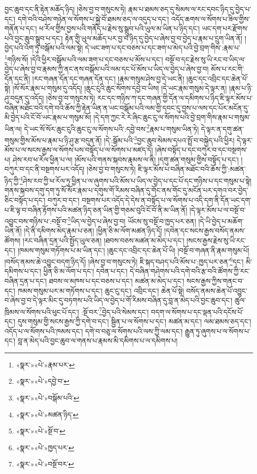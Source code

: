 བྱང་ཆུབ་དང་ནི་རྟེན་མཆོད་ཉིད། །ཅེས་བྱ་བ་གསུངས་ཏེ། རྣམ་པ་ཐམས་ཅད་དུ་སེམས་ལ་རང་དབང་ཉིད་དུ་བྱེད་པ་དང་། དགེ་བའི་བཤེས་གཉེན་ལ་སོགས་པ་སྐྱེ་བོ་ཐམས་ཅད་ལ་འདུད་པ་དང་། འདོད་ཆགས་ལ་སོགས་པ་ཟིལ་གྱིས་གནོན་པ་དང་། ཕ་རོལ་གྱིས་བྱས་པའི་གནོད་པ་རྗེས་སུ་སྒྲུབ་པའི་ཡུལ་མ་ཡིན་པ་ཉིད་དང་། ཡང་དག་པར་རྫོགས་པའི་བྱང་ཆུབ་སྒྲུབ་པ་དང་། རྟེན་གྱི་ཡུལ་མཆོད་པར་བྱ་བ་ཉིད་དུ་བྱེད་པ་ཞེས་བྱ་བ་བྱེད་པ་རྣམ་པ་དྲུག་ཡིན་ནོ། །བྱེད་པའི་འོག་ཏུ་བསྒོམ་པའི་ལམ་སྟེ། དེ་ཡང་ཟག་པ་དང་བཅས་པ་དང་ཟག་པ་མེད་པའི་བྱེ་བྲག་གིས་:རྣམ་པ་\footnote{«སྣར་»«པེ་»རྣམ་པར་}གཉིས་སོ། །དེའི་ཕྱིར་བསྒོམ་པའི་ལམ་ཟག་པ་དང་བཅས་པ་མོས་པ་དང་། བསྔོ་བ་དང་རྗེས་སུ་ཡི་རང་བ་ཡིད་ལ་བྱེད་པ་ཞེས་བྱ་བ་རྣམས་ཀྱི་ནང་ནས་བསྒོམ་པའི་ལམ་དང་པོ་མོས་པ་ཡིད་ལ་བྱེད་པ་ཞེས་བྱ་བ། མོས་པ་རང་གི་དོན་དང་ནི། །རང་གཞན་དོན་དང་གཞན་དོན་དང་། །རྣམ་གསུམ་ཤེས་བྱ་དེ་ཡང་ནི། །ཆུང་དང་འབྲིང་དང་ཆེན་པོ་སྟེ། །སོ་སོར་རྣམ་པ་གསུམ་དུ་འདོད། །ཆུང་ངུའི་ཆུང་སོགས་དབྱེ་བ་ཡིས། །དེ་ཡང་རྣམ་གསུམ་དེ་ལྟར་ན། །རྣམ་པ་ཉི་ཤུ་བདུན་དུ་འདོད། །ཅེས་བྱ་བ་གསུངས་ཏེ། རང་དང་གཉིས་ཀ་དང་གཞན་གྱི་དོན་ལ་དམིགས་པ་ཉིད་ཇི་ལྟར་མོས་པ་བཞིན་མཐོང་བའི་དགེ་བའི་ཆོས་ཀྱི་རྟེན་ཡིན་ན་ཡང་བསྒོམ་པའི་ལམ་གྱི་དབང་དུ་བྱས་པ་ལས་དང་པོར་མངོན་དུ་མི་བྱེད་པའི་ངོ་བོ་ཡང་རྣམ་པ་གསུམ་མོ། །དེ་དག་ཀྱང་རེ་རེ་ཞིང་ཆུང་ངུ་ལ་སོགས་པའི་བྱེ་བྲག་གིས་རྣམ་པ་གསུམ་ཡིན་ལ། དེ་ཡང་སོ་སོར་ཆུང་ངུའི་ཆུང་ངུ་ལ་སོགས་པའི་:དབྱེ་བས་\footnote{«སྣར་»«པེ་»དབྱེ་བ་}རྣམ་པ་གསུམ་ཡིན་ཏེ། དེ་ལྟར་ན་དགུ་ཚན་གསུམ་གྱིས་མོས་པ་རྣམ་པ་ཉི་ཤུ་རྩ་བདུན་ནོ། །དེ་:སྒོམ་པའི་\footnote{«སྣར་»«པེ་»བསྒོམ་པའི་}བྱང་ཆུབ་སེམས་དཔའ་སྤྲོ་བ་བསྐྱེད་པའི་ཕྱིར། དེ་ལྟར་མོས་པ་ལ་སངས་རྒྱས་ལ་སོགས་པས་བསྟོད་པ་ལ་སོགས་པ་མཛད་དོ། །ཞེས་བསྟོད་པ་དང་བཀུར་བ་དང་བསྔགས་པ། ཤེས་རབ་ཕ་རོལ་ཕྱིན་པ་ལ། །མོས་པའི་གནས་སྐབས་རྣམས་ལ་ནི། །དགུ་ཚན་གསུམ་གྱིས་བསྟོད་པ་དང་། །བཀུར་བ་དང་ནི་བསྔགས་པར་འདོད། །ཅེས་བྱ་བ་གསུངས་ཏེ། ཇི་ལྟར་མོས་པ་བཞིན་མཐོང་བའི་ཆོས་ཀྱི་:མཚན་ཉིད་ཀྱི་\footnote{«སྣར་»«པེ་»མཚན་ཉིད་}ཤེས་རབ་ཀྱི་ཕ་རོལ་ཏུ་ཕྱིན་པ་ལ་ཞུགས་པའི་མོས་པ་ཡིད་ལ་བྱེད་པ་དང་པོ་དང་གཉིས་པ་དང་གསུམ་པ་སྟེ། གནས་སྐབས་དགུ་དག་ཏུ་སོ་སོར་རྣམ་པ་དགུས་གོ་རིམས་བཞིན་དུ་གོང་ནས་གོང་དུ་མངོན་པར་དགའ་བར་བྱེད་ཅིང་བསྟོད་པ་དང་། བཀུར་བ་དང་། བསྔགས་པར་འདོད་དེ་དེས་ན་བསྟོད་པ་ལ་སོགས་པ་འདི་དག་ནི་དོན་ཡང་དག་པ་ཇི་ལྟ་བ་བཞིན་རྟོགས་པའི་མཚན་ཉིད་ཅན་ཡིན་གྱི་གཅམ་བུའི་ངོ་བོ་ནི་མ་ཡིན་ནོ། །དེ་ལྟར་མོས་པ་ལ་བསྔོ་བ་འབྱུང་བས་གཉིས་པ་:བསྔོ་བ་\footnote{«སྣར་»«པེ་»སྔོ་བ་}ཡིད་ལ་བྱེད་པ་ཞེས་བྱ་བ། ཡོངས་སུ་བསྔོ་བ་ཁྱད་པར་ཅན། །དེ་ཡི་བྱེད་པ་མཆོག་ཡིན་ནོ། །དེ་ནི་དམིགས་མེད་རྣམ་པ་ཅན། །ཕྱིན་ཅི་མ་ལོག་མཚན་ཉིད་དོ། །དབེན་དང་སངས་རྒྱས་བསོད་ནམས་ཚོགས། །རང་བཞིན་དྲན་པའི་སྤྱོད་ཡུལ་ཅན། །ཐབས་བཅས་མཚན་མ་མེད་པ་དང་། །སངས་རྒྱས་རྗེས་སུ་ཡི་རང་དང་། །ཁམས་གསུམ་གཏོགས་པ་མ་ཡིན་དང་། །ཆུང་དང་འབྲིང་དང་ཆེན་པོ་ཡི། །བསྔོ་བ་གཞན་ནི་རྣམ་གསུམ་པོ། །བསོད་ནམས་ཆེ་འབྱུང་བདག་ཉིད་དོ། །ཞེས་བྱ་བ་གསུངས་ཏེ། ཇི་སྐད་བཤད་པའི་མོས་པ་:ཁྱད་པར་ཅན་\footnote{«སྣར་»«པེ་»ཁྱད་པར་}དང་། མི་དམིགས་པ་དང་། ཕྱིན་ཅི་མ་ལོག་པ་དང་། དབེན་པ་དང་། དེ་བཞིན་གཤེགས་པའི་དགེ་བའི་རྩ་བའི་ཚོགས་ཀྱི་རང་བཞིན་དྲན་པ་དང་། ཐབས་ལ་མཁས་པ་དང་བཅས་པ་དང་། མཚན་མ་མེད་པ་དང་། སངས་རྒྱས་ཀྱིས་གནང་བ་དང་། ཁམས་གསུམ་པར་མ་གཏོགས་པ་དང་། ཆུང་ངུ་དང་། འབྲིང་དང་། ཆེན་པོ་སྟེ། བསོད་ནམས་ཆེན་པོ་འབྱུང་བ་ཞེས་བྱ་བ་དེ་ལྟར་མིང་དུ་བཏགས་པའི་ཡིད་ལ་བྱེད་པ་གོ་རིམས་བཞིན་དུ་བླ་ན་མེད་པའི་བྱང་ཆུབ་དང་། ཚུལ་ཁྲིམས་ལ་སོགས་པའི་ཕུང་པོ་དང་། :སྔོ་བར་\footnote{«སྣར་»«པེ་»བསྔོ་བར་}བྱེད་པའི་སེམས་དང་། བདག་ལ་སོགས་པ་དང་ལྡན་པའི་དངོས་པོ་དང་། དུས་གསུམ་གྱི་སངས་རྒྱས་ཀྱི་དགེ་བ་དང་། སྦྱིན་པ་ལ་སོགས་པ་དང་། མཚན་མ་དང་། ལམ་ཐམས་ཅད་དང་། འདོད་པ་ལ་སོགས་པའི་ཁམས་དང་། དགེ་བ་བཅུ་ལ་སོགས་པའི་ལས་ཀྱི་ལམ་དང་། རྒྱུན་ཏུ་ཞུགས་པ་ལ་སོགས་པ་དང་། བླ་ན་མེད་པའི་བྱང་ཆུབ་ལ་གནས་པ་རྣམས་མི་དམིགས་པ་ལ་དམིགས་པ། 